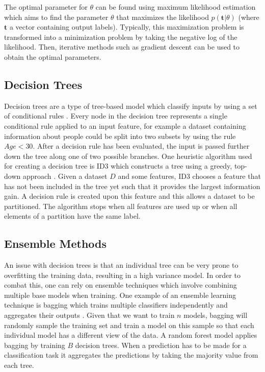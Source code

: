 \documentclass[../main.tex]{subfiles}
\begin{document}
The optimal parameter for $\theta$ can be found using maximum likelihood estimation which aims to find the parameter $\theta$ that maximizes the likelihood $p(\textbf{t}|\theta)$ (where $\textbf{t}$ a vector containing output labels). Typically, this maximization problem is transformed into a minimization problem by taking the negative log of the likelihood. Then, iterative methods such as gradient descent can be used to obtain the optimal parameters. 


\subsection{Decision Trees}

Decision trees are a type of tree-based model which classify inputs by using a set of conditional rules \cite{grzymala1993selected}. Every node in the decision tree represents a single conditional rule applied to an input feature, for example a dataset containing information about people could be split into two subsets by using the rule $Age < 30$. After a decision rule has been evaluated, the input is passed further down the tree along one of two possible branches. One heuristic algorithm used for creating a decision tree is ID3 which constructs a tree using a greedy, top-down approach \cite{quinlan1986induction}. Given a dataset $D$ and some features, ID3 chooses a feature that has not been included in the tree yet such that it provides the largest information gain. A decision rule is created upon this feature and this allows a dataset to be partitioned. The algorithm stops when all features are used up or when all elements of a partition have the same label. 
 
\subsection{Ensemble Methods}

An issue with decision trees is that an individual tree can be very prone to overfitting the training data, resulting in a high variance model. In order to combat this, one can rely on ensemble techniques which involve combining multiple base models when training. One example of an ensemble learning technique is bagging which trains multiple classifiers independently and aggregates their outputs \cite{breiman1996bagging}. Given that we want to train $n$ models, bagging will randomly sample the training set and train a model on this sample so that each individual model has a different view of the data. A random forest model applies bagging by training $B$ decision trees. When a prediction has to be made for a classification task it aggregates the predictions by taking the majority value from each tree. 
\end{document}
